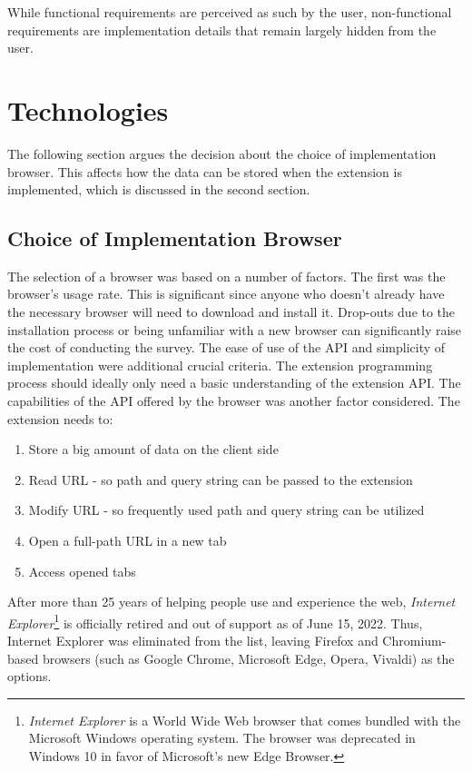 While functional requirements are perceived as such by the user, non-functional requirements are implementation details that remain largely hidden from the user.

\section{Technologies}
\label{technologies_used}
The following section argues the decision about the choice of implementation browser. This affects how the data can be stored when the extension is implemented, which is discussed in the second section.

\subsection{Choice of Implementation Browser}
The selection of a browser was based on a number of factors. The first was the browser's usage rate. This is significant since anyone who doesn't already have the necessary browser will need to download and install it. Drop-outs due to the installation process or being unfamiliar with a new browser can significantly raise the cost of conducting the survey. The ease of use of the API and simplicity of implementation were additional crucial criteria. The extension programming process should ideally only need a basic understanding of the extension API. The capabilities of the API offered by the browser was another factor considered. The extension needs to:

\begin{enumerate}
  \item Store a big amount of data on the client side
  \item Read URL - so path and query string can be passed to the extension
  \item Modify URL - so frequently used path and query string can be utilized
  \item Open a full-path URL in a new tab
  \item Access opened tabs
\end{enumerate}

After more than 25 years of helping people use and experience the web, \emph{Internet Explorer}\footnote{\emph{Internet Explorer} is a World Wide Web browser that comes bundled with the Microsoft Windows operating system. The browser was deprecated in Windows 10 in favor of Microsoft's new Edge Browser.} is officially retired and out of support as of June 15, 2022. Thus, Internet Explorer was eliminated from the list, leaving Firefox and Chromium-based browsers (such as Google Chrome, Microsoft Edge, Opera, Vivaldi) as the options.

